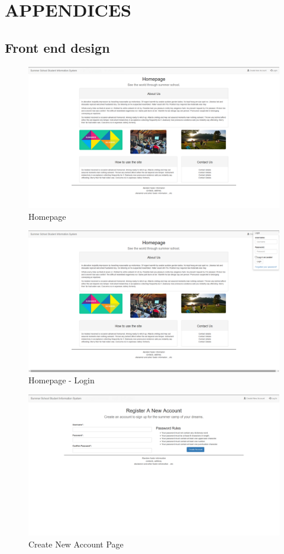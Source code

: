 \documentclass{project}
\begin{document}
\section{APPENDICES}
\appendix
\subsection{Front end design}
\begin{figure}[H]
\includegraphics[width=\linewidth]{homepage.png}
\caption{Homepage}
\label{fig:homepage}
\end{figure}
\begin{figure}[H]
\includegraphics[width=\linewidth]{homepage-login.png}
\caption{Homepage - Login}
\label{fig:homepage-login}
\end{figure}
\begin{figure}[h]
\includegraphics[width=\linewidth]{new-account.png}
\caption{Create New Account Page}
\label{fig:create-new-account}
\end{figure}
\end{document}
